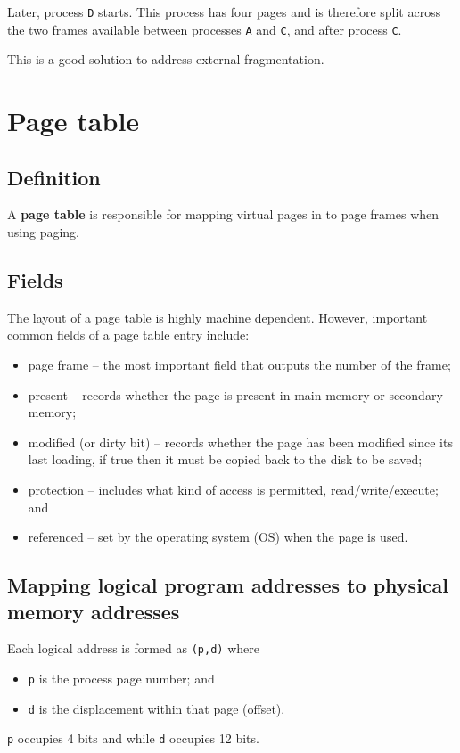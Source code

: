 \documentclass[a4paper]{systems-software}
\begin{document}
Later, process \texttt{D} starts. This process has four pages and is therefore split across the two frames available between processes \texttt{A} and \texttt{C}, and after process \texttt{C}.

This is a good solution to address external fragmentation.


\newpage

\section*{Page table}

\subsection*{Definition}

A \textbf{page table} is responsible for mapping virtual pages in to page frames when using paging.


\subsection*{Fields}

The layout of a page table is highly machine dependent. However, important common fields of a page table entry include:
\begin{itemize}
	\item page frame -- the most important field that outputs the number of the frame;
	\item present -- records whether the page is present in main memory or secondary memory;
	\item modified (or dirty bit) -- records whether the page has been modified since its last loading, if true then it must be copied back to the disk to be saved;
	\item protection -- includes what kind of access is permitted, read/write/execute; and
	\item referenced -- set by the operating system (OS) when the page is used.
\end{itemize}


\subsection*{Mapping logical program addresses to physical memory addresses}

Each logical address is formed as \texttt{(p,d)} where
\begin{itemize}
	\item \texttt{p} is the process page number; and
	\item \texttt{d} is the displacement within that page (offset).
\end{itemize}
\texttt{p} occupies 4 bits and while \texttt{d} occupies 12 bits.
\end{document}
